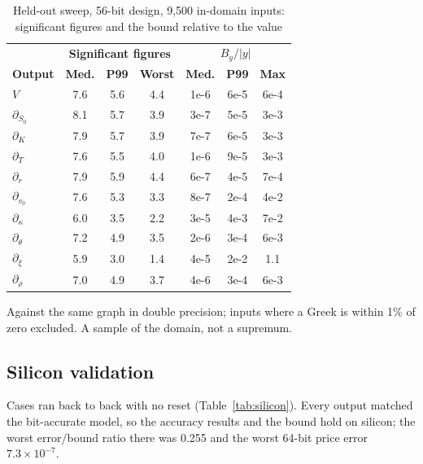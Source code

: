 \documentclass[conference]{IEEEtran}
\begin{document}
\begin{table}[!t]
\centering
\caption{Held-out sweep, 56-bit design, 9,500 in-domain inputs: significant figures and the bound relative to the value}
\label{tab:acc}
\footnotesize
\setlength{\tabcolsep}{3pt}
\begin{tabular}{@{}lccc|ccc@{}}
\toprule
& \multicolumn{3}{c|}{\textbf{Significant figures}} & \multicolumn{3}{c}{\textbf{$B_y/|y|$}}\\
\textbf{Output} & \textbf{Med.} & \textbf{P99} & \textbf{Worst} & \textbf{Med.} & \textbf{P99} & \textbf{Max}\\
\midrule
$V$ & 7.6 & 5.6 & 4.4 & 1e-6 & 6e-5 & 6e-4\\
$\partial_{S_0}$ & 8.1 & 5.7 & 3.9 & 3e-7 & 5e-5 & 3e-3\\
$\partial_{K}$ & 7.9 & 5.7 & 3.9 & 7e-7 & 6e-5 & 3e-3\\
$\partial_{T}$ & 7.6 & 5.5 & 4.0 & 1e-6 & 9e-5 & 3e-3\\
$\partial_{r}$ & 7.9 & 5.9 & 4.4 & 6e-7 & 4e-5 & 7e-4\\
$\partial_{v_0}$ & 7.6 & 5.3 & 3.3 & 8e-7 & 2e-4 & 4e-2\\
$\partial_{\kappa}$ & 6.0 & 3.5 & 2.2 & 3e-5 & 4e-3 & 7e-2\\
$\partial_{\theta}$ & 7.2 & 4.9 & 3.5 & 2e-6 & 3e-4 & 6e-3\\
$\partial_{\xi}$ & 5.9 & 3.0 & 1.4 & 4e-5 & 2e-2 & 1.1\\
$\partial_{\rho}$ & 7.0 & 4.9 & 3.7 & 4e-6 & 3e-4 & 6e-3\\
\bottomrule
\end{tabular}
\par\vspace{2pt}\parbox{\columnwidth}{\scriptsize Against the same graph in double precision; inputs where a Greek is within 1\% of zero excluded. A sample of the domain, not a supremum.}
\end{table}

\subsection{Silicon validation}
\label{sec:res-silicon}
Cases ran back to back with no reset (Table~\ref{tab:silicon}). Every output matched the bit-accurate
model, so the accuracy results and the bound hold on silicon; the worst error/bound ratio there was 0.255
and the worst 64-bit price error $7.3\times10^{-7}$.
\end{document}
